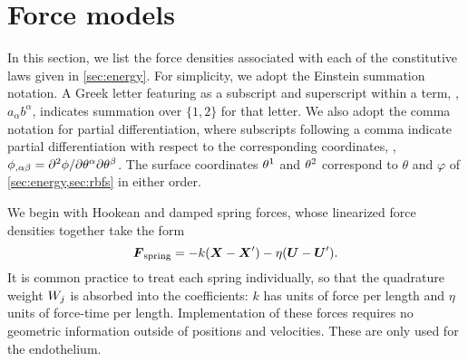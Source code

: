 \section{Force models}\label{sec:forces}

In this section, we list the force densities associated with each of the constitutive laws given in
\cref{sec:energy}. For simplicity, we adopt the Einstein summation notation. A Greek letter featuring as a
subscript and superscript within a term, , $a_\alpha b^\alpha$, indicates summation over $\{1, 2\}$
for that letter. We also adopt the comma notation for partial differentiation, where subscripts following a comma
indicate partial differentiation with respect to the corresponding coordinates, ,
$\phi_{,\alpha\beta} = \partial^2\phi/\partial\q[\alpha]\partial\q[\beta]$. The surface coordinates $\q[1]$ and
$\q[2]$ correspond to $\theta$ and $\varphi$ of \cref{sec:energy,sec:rbfs} in either order.

We begin with Hookean and damped spring forces, whose linearized force densities together take the form
\begin{equation}
    \boldsymbol{F}_\text{spring} = -k (\boldsymbol{X} - \boldsymbol{X}') - \eta(\boldsymbol{U} - \boldsymbol{U}').
\end{equation}
It is common practice to treat each spring individually, so that the quadrature weight $\weight[j]$ is absorbed
into the coefficients: $k$ has units of force per length and $\eta$ units of force-time per length. Implementation
of these forces requires no geometric information outside of positions and velocities. These are only used for the
endothelium.

